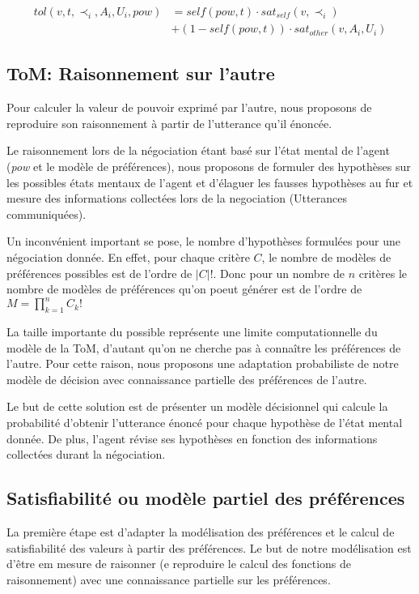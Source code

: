 \documentclass{llncs}
\begin{document}
	\begin{equation}
	\begin{split}
	tol(v, t, \prec_i, A_i, U_i, pow) & = self(pow, t)  \cdot sat_{self}(v, \prec_i) \\
	& +  (1 - self(pow, t)) \cdot sat_{other}(v, A_i, U_i)
	\end{split} 
	\end{equation}
	
	
	\subsection{ToM: Raisonnement sur l'autre}
	
	
	Pour calculer la valeur de pouvoir exprimé par l'autre, nous proposons de reproduire son raisonnement à partir de l'utterance qu'il énoncée.
	
	Le raisonnement lors de la négociation étant basé  sur l'état mental de l'agent (\textit{pow} et le modèle de préférences), nous proposons de formuler des hypothèses sur les possibles états mentaux de l'agent et d'élaguer les fausses hypothèses au fur et mesure des informations collectées lors de la negociation (Utterances communiquées).
	
	Un inconvénient important se pose, le nombre d'hypothèses formulées pour une négociation donnée. En effet, pour chaque critère $C$, le nombre de modèles de préférences possibles est de l'ordre de $|C| !$. Donc pour un nombre de $n$ critères le nombre de modèles de préférences qu'on poeut générer est de l'ordre de $ M = \prod_{k=1}^n C_k!$
	
	La taille importante du possible représente une limite computationnelle du modèle de la ToM, d'autant qu'on ne cherche pas à connaître les préférences de l'autre. Pour cette raison, nous proposons une adaptation probabiliste de notre modèle de décision avec connaissance partielle des préférences de l'autre. 
	
	Le but de cette solution est de présenter un modèle décisionnel qui calcule la probabilité d'obtenir l'utterance énoncé pour chaque hypothèse de l’état mental donnée. De plus, l'agent révise ses hypothèses en fonction des informations collectées durant la négociation.
	
	
	\subsection{Satisfiabilité ou modèle partiel des préférences}
	\label{sec:sat}
	La première étape est d'adapter la modélisation des préférences et le calcul de satisfiabilité des valeurs à partir des préférences. Le but de notre modélisation est d'être em mesure de raisonner (e reproduire le calcul des fonctions de raisonnement) avec une connaissance partielle sur les préférences. 
	
\end{document}
